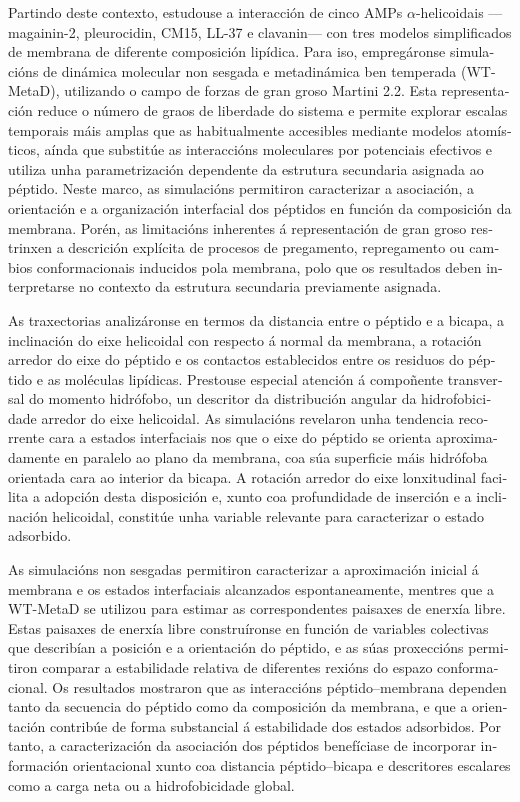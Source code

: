\begin{otherlanguage}{galician}
Partindo deste contexto, estudouse a interacción de cinco AMPs $\alpha$-helicoidais —magainin-2, pleurocidin, CM15, LL-37 e clavanin— con tres modelos simplificados de membrana de diferente composición lipídica. Para iso, empregáronse simulacións de dinámica molecular non sesgada e metadinámica ben temperada (WT-MetaD), utilizando o campo de forzas de gran groso Martini 2.2. Esta representación reduce o número de graos de liberdade do sistema e permite explorar escalas temporais máis amplas que as habitualmente accesibles mediante modelos atomísticos, aínda que substitúe as interaccións moleculares por potenciais efectivos e utiliza unha parametrización dependente da estrutura secundaria asignada ao péptido. Neste marco, as simulacións permitiron caracterizar a asociación, a orientación e a organización interfacial dos péptidos en función da composición da membrana. Porén, as limitacións inherentes á representación de gran groso restrinxen a descrición explícita de procesos de pregamento, repregamento ou cambios conformacionais inducidos pola membrana, polo que os resultados deben interpretarse no contexto da estrutura secundaria previamente asignada.

As traxectorias analizáronse en termos da distancia entre o péptido e a bicapa, a inclinación do eixe helicoidal con respecto á normal da membrana, a rotación arredor do eixe do péptido e os contactos establecidos entre os residuos do péptido e as moléculas lipídicas. Prestouse especial atención á compoñente transversal do momento hidrófobo, un descritor da distribución angular da hidrofobicidade arredor do eixe helicoidal. As simulacións revelaron unha tendencia recorrente cara a estados interfaciais nos que o eixe do péptido se orienta aproximadamente en paralelo ao plano da membrana, coa súa superficie máis hidrófoba orientada cara ao interior da bicapa. A rotación arredor do eixe lonxitudinal facilita a adopción desta disposición e, xunto coa profundidade de inserción e a inclinación helicoidal, constitúe unha variable relevante para caracterizar o estado adsorbido.

As simulacións non sesgadas permitiron caracterizar a aproximación inicial á membrana e os estados interfaciais alcanzados espontaneamente, mentres que a WT-MetaD se utilizou para estimar as correspondentes paisaxes de enerxía libre. Estas paisaxes de enerxía libre construíronse en función de variables colectivas que describían a posición e a orientación do péptido, e as súas proxeccións permitiron comparar a estabilidade relativa de diferentes rexións do espazo conformacional. Os resultados mostraron que as interaccións péptido–membrana dependen tanto da secuencia do péptido como da composición da membrana, e que a orientación contribúe de forma substancial á estabilidade dos estados adsorbidos. Por tanto, a caracterización da asociación dos péptidos benefíciase de incorporar información orientacional xunto coa distancia péptido–bicapa e descritores escalares como a carga neta ou a hidrofobicidade global.


\end{otherlanguage}
